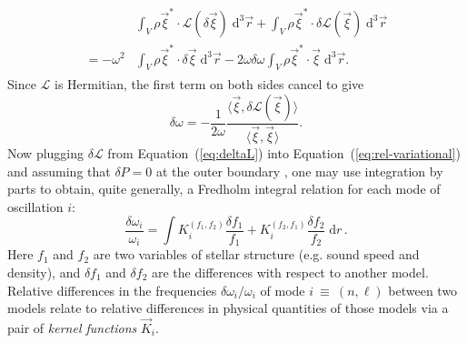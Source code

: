 {\begin{align}
\begin{split}
    &\int_V \rho \vec\xi^\ast \cdot  \mathcal{L}(\delta\vec\xi) \; \text{d}^3\vec r
    +
    \int_V \rho \vec\xi^\ast \cdot  \delta\mathcal{L}(\vec\xi) \; \text{d}^3\vec r
    \\= -\omega^2&\int_V \rho \vec\xi^\ast \cdot  \delta\vec\xi \; \text{d}^3\vec r
    -2\omega\delta\omega\int_V \rho \vec\xi^\ast \cdot  \vec\xi \; \text{d}^3\vec r.
\end{split}
\end{align}
Since $\mathcal{L}$ is Hermitian, the first term on both sides cancel to give
\begin{equation} \label{eq:rel-variational}
    \delta\omega
    =
    -\frac{1}{2\omega}\frac{\langle \vec\xi, \delta \mathcal{L}(\vec\xi) \rangle}{\langle \vec\xi, \vec\xi \rangle}.
\end{equation}
Now plugging $\delta\mathcal{L}$ from Equation~(\ref{eq:deltaL}) into Equation~(\ref{eq:rel-variational}) and assuming that $\delta P=0$ at the outer boundary \citep[e.g.,][]{1967MNRAS.136..293L}, one may use integration by parts to obtain, quite generally, a Fredholm integral relation for each mode of oscillation $i$:
\begin{equation} \label{eq:forward} \boxed{
  \frac{\delta\omega_i}{\omega_i} 
  = 
  \int K_i^{(f_1, f_2)} \frac{\delta f_1}{f_1}
                + K_i^{(f_2, f_1)} \frac{\delta f_2}{f_2}
       \;\text{d}r
}\,. \end{equation}}
Here $f_1$ and $f_2$ are two variables of stellar structure (e.g. sound speed and density), and
${\delta f_1}$ and ${\delta f_2}$ are the differences with respect to another model. %
Relative differences in the frequencies ${\delta\omega_i/\omega_i}$ of mode ${i~\equiv~(n,\ell)}$ between two models relate to relative differences in physical quantities of those models via a pair of \emph{kernel functions} $\vec{K}_i$. 

